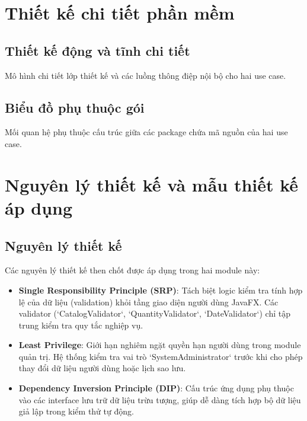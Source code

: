 \documentclass[12pt]{extreport}
\begin{document}
\chapter{Thiết kế chi tiết phần mềm}
\section{Thiết kế động và tĩnh chi tiết}
Mô hình chi tiết lớp thiết kế và các luồng thông điệp nội bộ cho hai use case.

\section{Biểu đồ phụ thuộc gói}
Mối quan hệ phụ thuộc cấu trúc giữa các package chứa mã nguồn của hai use case.

\chapter{Nguyên lý thiết kế và mẫu thiết kế áp dụng}
\section{Nguyên lý thiết kế}
Các nguyên lý thiết kế then chốt được áp dụng trong hai module này:
\begin{itemize}
    \item \textbf{Single Responsibility Principle (SRP)}: Tách biệt logic kiểm tra tính hợp lệ của dữ liệu (validation) khỏi tầng giao diện người dùng JavaFX. Các validator (`CatalogValidator`, `QuantityValidator`, `DateValidator`) chỉ tập trung kiểm tra quy tắc nghiệp vụ.
    \item \textbf{Least Privilege}: Giới hạn nghiêm ngặt quyền hạn người dùng trong module quản trị. Hệ thống kiểm tra vai trò `SystemAdministrator` trước khi cho phép thay đổi dữ liệu người dùng hoặc lịch sao lưu.
    \item \textbf{Dependency Inversion Principle (DIP)}: Cấu trúc ứng dụng phụ thuộc vào các interface lưu trữ dữ liệu trừu tượng, giúp dễ dàng tích hợp bộ dữ liệu giả lập trong kiểm thử tự động.
\end{itemize}
\end{document}
